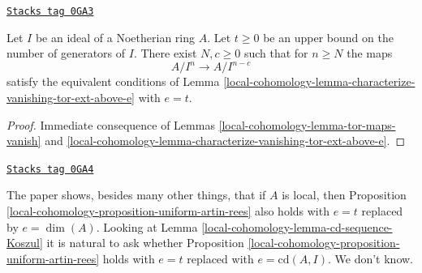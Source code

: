 \begin{proposition}
\label{local-cohomology-proposition-uniform-artin-rees}
\href{https://stacks.math.columbia.edu/tag/0GA3}{\texttt{Stacks tag 0GA3}}

Let $I$ be an ideal of a Noetherian ring $A$. Let $t \geq 0$
be an upper bound on the number of generators of $I$.
There exist $N, c \geq 0$ such that for $n \geq N$ the maps
$$
A/I^n \to A/I^{n - c}
$$
satisfy the equivalent conditions of
Lemma \ref{local-cohomology-lemma-characterize-vanishing-tor-ext-above-e} with $e = t$.
\end{proposition}

\begin{proof}
Immediate consequence of Lemmas
\ref{local-cohomology-lemma-tor-maps-vanish} and
\ref{local-cohomology-lemma-characterize-vanishing-tor-ext-above-e}.
\end{proof}

\begin{remark}
\label{local-cohomology-remark-better-bound}
\href{https://stacks.math.columbia.edu/tag/0GA4}{\texttt{Stacks tag 0GA4}}

The paper \cite{AHS} shows, besides many other things, that if $A$ is local,
then Proposition \ref{local-cohomology-proposition-uniform-artin-rees} also holds
with $e = t$ replaced by $e = \dim(A)$. Looking at
Lemma \ref{local-cohomology-lemma-cd-sequence-Koszul} it is natural to ask whether
Proposition \ref{local-cohomology-proposition-uniform-artin-rees}
holds with $e = t$ replaced with $e = \text{cd}(A, I)$. We don't know.
\end{remark}

